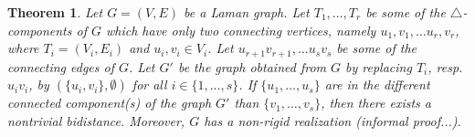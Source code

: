 \documentclass[a4paper, 11pt]{article}
\newcommand{\trcomps}{$\triangle$-components}
\newtheorem{thm}{Theorem}[section]
\theoremstyle{definition}
\begin{document}
\begin{thm}
\label{thm:cutToTwoParts}
Let $G=(V,E)$ be a Laman graph. Let  $T_1, \dots, T_r$ be some of the \trcomps{} of $G$ which have only two connecting vertices, namely $u_1, v_1, \dots u_r,v_r$, where  $T_i=(V_i,E_i)$ and $u_i, v_i\in V_i$. Let  $u_{r+1}v_{r+1}, \dots u_s v_s$ be some of the connecting edges of $G$. Let $G'$ be the graph obtained from $G$ by replacing $T_i$, resp. $u_iv_i$, by $(\{u_i, v_i\}, \emptyset)$ for all $i\in \{1, \dots, s\}$.
If $\{u_1, \dots, u_s\}$ are in the different connected component(s) of the graph $G'$ than $\{v_1, \dots, v_s\}$, then there exists a nontrivial bidistance.  Moreover, $G$ has a non-rigid realization (informal proof...).
\end{thm}
\end{document}
